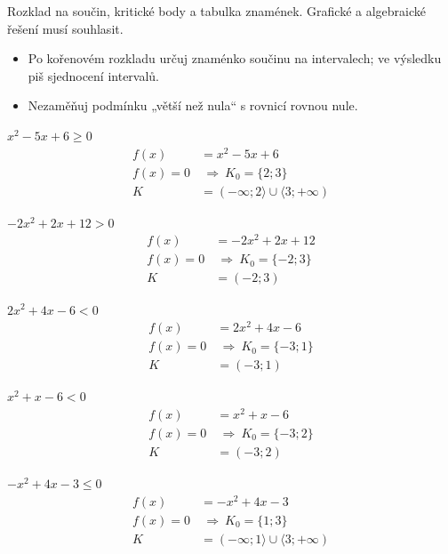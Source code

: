 \documentclass[11pt,a4paper]{article}
\begin{document}
Rozklad na součin, kritické body a tabulka znamének. Grafické a algebraické řešení musí souhlasit.
\begin{itemize}
\item Po kořenovém rozkladu určuj znaménko součinu na intervalech; ve výsledku piš sjednocení intervalů.
\item Nezaměňuj podmínku „větší než nula“ s rovnicí rovnou nule.
\end{itemize}
\begin{prikladReseniBox}[title={Příklad 1}]
$x^{2} - 5x + 6\ge0$
\tcblower
\[
\begin{aligned}
f(x)&=x^{2} - 5x + 6\\[2pt]
f(x)=0&\ \Rightarrow\ K_0=\{2;3\}\\[2pt]
K&=(-\infty;2\rangle\cup\langle3;+\infty)
\end{aligned}
\]
\end{prikladReseniBox}
\begin{prikladReseniBox}[title={Příklad 2}]
$- 2x^{2} + 2x + 12>0$
\tcblower
\[
\begin{aligned}
f(x)&=- 2x^{2} + 2x + 12\\[2pt]
f(x)=0&\ \Rightarrow\ K_0=\{-2;3\}\\[2pt]
K&=(-2;3)
\end{aligned}
\]
\end{prikladReseniBox}
\begin{prikladReseniBox}[title={Příklad 3}]
$2x^{2} + 4x - 6<0$
\tcblower
\[
\begin{aligned}
f(x)&=2x^{2} + 4x - 6\\[2pt]
f(x)=0&\ \Rightarrow\ K_0=\{-3;1\}\\[2pt]
K&=(-3;1)
\end{aligned}
\]
\end{prikladReseniBox}
\begin{zadaniReseniBox}[title={Samostatná práce 1}]
$x^{2} + x - 6<0$
\tcblower
\[
\begin{aligned}
f(x)&=x^{2} + x - 6\\[2pt]
f(x)=0&\ \Rightarrow\ K_0=\{-3;2\}\\[2pt]
K&=(-3;2)
\end{aligned}
\]
\end{zadaniReseniBox}
\begin{zadaniReseniBox}[title={Samostatná práce 2}]
$- x^{2} + 4x - 3\le0$
\tcblower
\[
\begin{aligned}
f(x)&=- x^{2} + 4x - 3\\[2pt]
f(x)=0&\ \Rightarrow\ K_0=\{1;3\}\\[2pt]
K&=(-\infty;1\rangle\cup\langle3;+\infty)
\end{aligned}
\]
\end{zadaniReseniBox}
\end{document}
